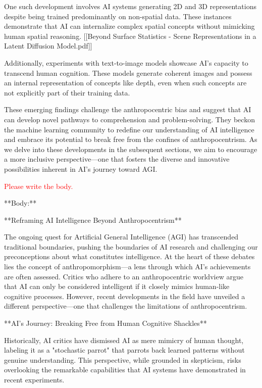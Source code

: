 \documentclass{article}
\begin{document}
One such development involves AI systems generating 2D and 3D representations despite being trained predominantly on non-spatial data. These instances demonstrate that AI can internalize complex spatial concepts without mimicking human spatial reasoning. [[Beyond Surface Statistics - Scene Representations in a Latent Diffusion Model.pdf]]

Additionally, experiments with text-to-image models showcase AI's capacity to transcend human cognition. These models generate coherent images and possess an internal representation of concepts like depth, even when such concepts are not explicitly part of their training data.

These emerging findings challenge the anthropocentric bias and suggest that AI can develop novel pathways to comprehension and problem-solving. They beckon the machine learning community to redefine our understanding of AI intelligence and embrace its potential to break free from the confines of anthropocentrism. As we delve into these developments in the subsequent sections, we aim to encourage a more inclusive perspective—one that fosters the diverse and innovative possibilities inherent in AI's journey toward AGI.

\textcolor{red}{Please write the body.}

**Body:**

**Reframing AI Intelligence Beyond Anthropocentrism**

The ongoing quest for Artificial General Intelligence (AGI) has transcended traditional boundaries, pushing the boundaries of AI research and challenging our preconceptions about what constitutes intelligence. At the heart of these debates lies the concept of anthropomorphism—a lens through which AI's achievements are often assessed. Critics who adhere to an anthropocentric worldview argue that AI can only be considered intelligent if it closely mimics human-like cognitive processes. However, recent developments in the field have unveiled a different perspective—one that challenges the limitations of anthropocentrism.

**AI's Journey: Breaking Free from Human Cognitive Shackles**

Historically, AI critics have dismissed AI as mere mimicry of human thought, labeling it as a "stochastic parrot" that parrots back learned patterns without genuine understanding. This perspective, while grounded in skepticism, risks overlooking the remarkable capabilities that AI systems have demonstrated in recent experiments.
\end{document}
